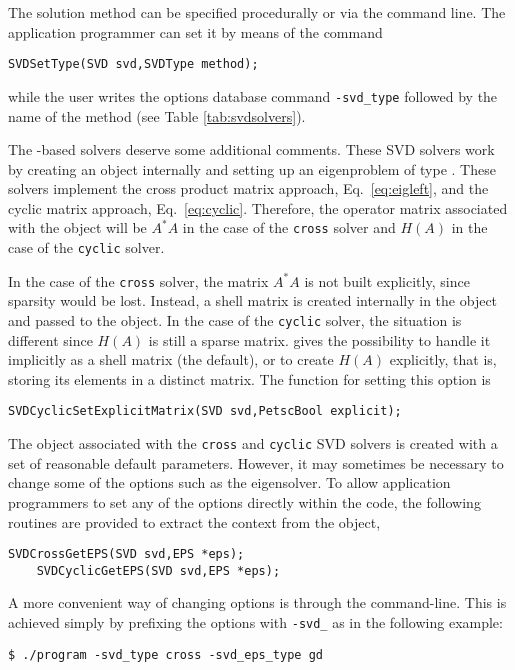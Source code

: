 The solution method can be specified procedurally or via the command line. The application programmer can set it by means of the command
	\begin{Verbatim}[fontsize=\small]
	SVDSetType(SVD svd,SVDType method);
	\end{Verbatim}
while the user writes the options database command \Verb!-svd_type! followed by the name of the method (see Table \ref{tab:svdsolvers}).

The -based solvers deserve some additional comments. These SVD solvers work by creating an  object internally and setting up an eigenproblem of type . These solvers implement the cross product matrix approach, Eq.\ \ref{eq:eigleft}, and the cyclic matrix approach, Eq.\ \ref{eq:cyclic}. Therefore, the operator matrix associated with the  object will be $A^*A$ in the case of the \texttt{cross} solver and $H(A)$ in the case of the \texttt{cyclic} solver.

In the case of the \texttt{cross} solver, the matrix $A^*A$ is not built explicitly, since sparsity would be lost. Instead, a shell matrix is created internally in the  object and passed to the  object. In the case of the \texttt{cyclic} solver, the situation is different since $H(A)$ is still a sparse matrix. \slepc gives the possibility to handle it implicitly as a shell matrix (the default), or to create $H(A)$ explicitly, that is, storing its elements in a distinct matrix. The function for setting this option is
	\begin{Verbatim}[fontsize=\small]
	SVDCyclicSetExplicitMatrix(SVD svd,PetscBool explicit);
	\end{Verbatim}

The  object associated with the \texttt{cross} and \texttt{cyclic} SVD solvers is created with a set of reasonable default parameters. However, it may sometimes be necessary to change some of the  options such as the eigensolver. To allow application programmers to set any of the  options directly within the code, the following routines are provided to extract the  context from the  object,
	\begin{Verbatim}[fontsize=\small]
	SVDCrossGetEPS(SVD svd,EPS *eps);
	SVDCyclicGetEPS(SVD svd,EPS *eps);
	\end{Verbatim}
A more convenient way of changing  options is through the command-line. This is achieved simply by prefixing the  options with \texttt{-svd\_} as in the following example:
\begin{Verbatim}[fontsize=\small]
	$ ./program -svd_type cross -svd_eps_type gd
\end{Verbatim}


